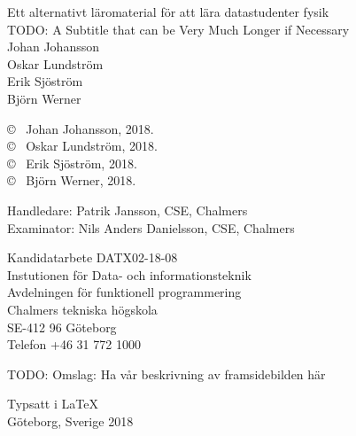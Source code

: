 \newpage
\thispagestyle{plain}
\vspace*{0cm}
Ett alternativt läromaterial för att lära datastudenter fysik\\
TODO: A Subtitle that can be Very Much Longer if Necessary\\
Johan Johansson \\
Oskar Lundström \\
Erik Sjöström \\
Björn Werner
\setlength{\parskip}{1cm}

\copyright ~ Johan Johansson, 2018. \setlength{\parskip}{1cm} \\
\copyright ~ Oskar Lundström, 2018. \setlength{\parskip}{1cm} \\
\copyright ~ Erik Sjöström, 2018. \setlength{\parskip}{1cm} \\
\copyright ~ Björn Werner, 2018. \setlength{\parskip}{1cm}

Handledare: Patrik Jansson, CSE, Chalmers\\
Examinator: Nils Anders Danielsson, CSE, Chalmers \setlength{\parskip}{1cm}

Kandidatarbete DATX02-18-08 \\
Instutionen för Data- och informationsteknik \\
Avdelningen för funktionell programmering\\
Chalmers tekniska högskola\\
SE-412 96 Göteborg\\
Telefon +46 31 772 1000
\setlength{\parskip}{0.5cm}%

\vfill
TODO: Omslag: Ha vår beskrivning av framsidebilden här

Typsatt i \LaTeX \\
Göteborg, Sverige 2018
